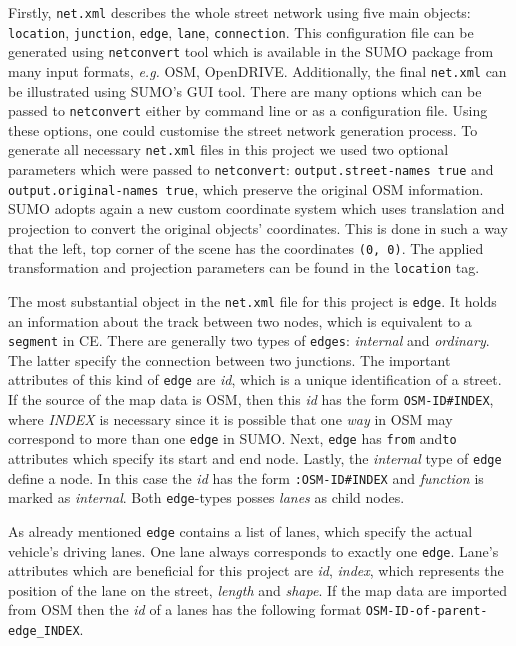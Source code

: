 Firstly, \texttt{net.xml} describes the whole street network using five main objects: \texttt{location}, \texttt{junction}, \texttt{edge}, \texttt{lane}, \texttt{connection}. This configuration file can be generated using \texttt{netconvert} tool which is available in the SUMO package from many input formats, \emph{e.g.} OSM, OpenDRIVE. Additionally, the final \texttt{net.xml} can be illustrated using SUMO's GUI tool. There are many options which can be passed to \texttt{netconvert} either by command line or as a configuration file. Using these options, one could customise the street network generation process. To generate all necessary \texttt{net.xml} files in this project we used two optional parameters which were passed to \texttt{netconvert}: \texttt{output.street-names true} and \texttt{output.original-names true}, which preserve the original OSM information. SUMO adopts again a new custom coordinate system which uses translation and projection to convert the original objects' coordinates. This is done in such a way that the left, top corner of the scene has the coordinates \texttt{(0, 0)}. The applied transformation and projection parameters can be found in the \texttt{location} tag.

The most substantial object in the \texttt{net.xml} file for this project is \texttt{edge}. It holds an information about the track between two nodes, which is equivalent to a \texttt{segment} in CE. There are generally two types of \texttt{edges}: \emph{internal} and \emph{ordinary}. The latter specify the connection between two junctions. The important attributes of this kind of \texttt{edge} are \emph{id}, which is a unique identification of a street. If the source of the map data is OSM, then this \emph{id} has the form \texttt{OSM-ID\#INDEX}, where \emph{INDEX} is necessary since it is possible that one \emph{way} in OSM may correspond to more than one \texttt{edge} in SUMO. Next, \texttt{edge} has \texttt{from} and\texttt{to} attributes which specify its start and end node. Lastly, the \emph{internal} type of \texttt{edge} define a node. In this case the \emph{id} has the form \texttt{:OSM-ID\#INDEX} and \emph{function} is marked as \emph{internal}. Both \texttt{edge}-types posses \emph{lanes} as child nodes.

As already mentioned \texttt{edge} contains a list of lanes, which specify the actual vehicle's driving lanes. One lane always corresponds to exactly one \texttt{edge}. Lane's attributes which are beneficial for this project are \emph{id}, \emph{index}, which represents the position of the lane on the street, \emph{length} and \emph{shape}. If the map data are imported from OSM then the \emph{id} of a lanes has the following format \texttt{OSM-ID-of-parent-edge\_INDEX}. 

